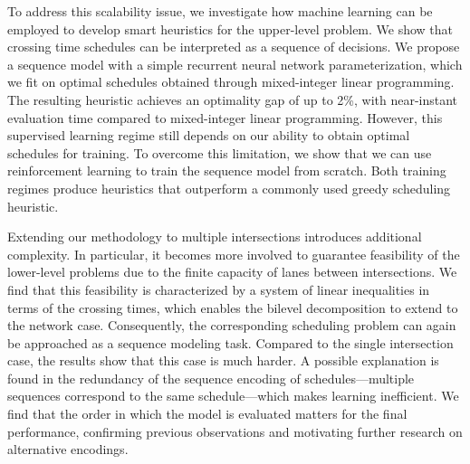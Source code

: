\documentclass[a4paper]{report}
\theoremstyle{definition}
\theoremstyle{plain}
\begin{document}
{To address this scalability issue, we investigate how machine learning can be
employed to develop smart heuristics for the upper-level problem.
%
We show that crossing time schedules can be interpreted as a sequence of
decisions.
%
We propose a sequence model with a simple recurrent neural network
parameterization, which we fit on optimal schedules obtained through
mixed-integer linear programming.
%
The resulting heuristic achieves an optimality gap of up to 2\%, with
near-instant evaluation time compared to mixed-integer linear programming.
%
However, this supervised learning regime still depends on our ability to obtain
optimal schedules for training.
%
To overcome this limitation, we show that we can use reinforcement learning to
train the sequence model from scratch.
%
Both training regimes produce heuristics that outperform a commonly used greedy
scheduling heuristic.

Extending our methodology to multiple intersections introduces additional
complexity. In particular, it becomes more involved to guarantee feasibility of
the lower-level problems due to the finite capacity of lanes between
intersections.
%
We find that this feasibility is characterized by a system of linear
inequalities in terms of the crossing times, which enables the bilevel
decomposition to extend to the network case.
%
Consequently, the corresponding scheduling problem can again be approached as a
sequence modeling task.
%
Compared to the single intersection case, the results show that this case is
much harder.
%
A possible explanation is found in the redundancy of the sequence encoding of
schedules---multiple sequences correspond to the same schedule---which makes
learning inefficient.
%
We find that the order in which the model is evaluated matters for the final
performance, confirming previous observations and motivating further research on
alternative encodings. }

%
%

\renewcommand{\cftpartfont}{\color{red!70!black}}
\renewcommand{\cftpartpresnum}{}

\makeatletter
\renewcommand{\toclevel@part}{100}
\makeatother


\newpage
\tableofcontents

\end{document}
